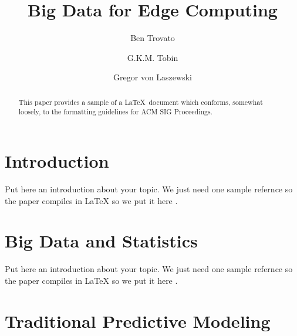 \documentclass[sigconf]{acmart}
\begin{document}
\title{Big Data for Edge Computing}


\author{Ben Trovato}

\author{G.K.M. Tobin}

\author{Gregor von Laszewski}


\renewcommand{\shortauthors}{G. v. Laszewski}


\begin{abstract}
This paper provides a sample of a \LaTeX\ document which conforms,
somewhat loosely, to the formatting guidelines for
ACM SIG Proceedings.
\end{abstract}



\maketitle



\section{Introduction}

Put here an introduction about your topic. 
We just need one sample refernce so the paper compiles in LaTeX so we
put it here \cite{editor00}.

\section{Big Data and Statistics}

Put here an introduction about your topic. 
We just need one sample refernce so the paper compiles in LaTeX so we
put it here \cite{editor00}.


\section{Traditional Predictive Modeling}
\end{document}
